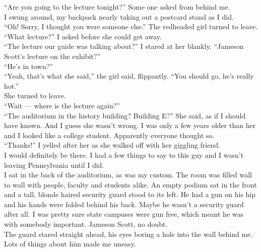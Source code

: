 \documentclass[a5paper]{scrartcl}
\begin{document}
\enquote{Are you going to the lecture tonight?} Some one asked from behind me.\\


I swung around, my backpack nearly taking out a postcard stand as I did.\\


\enquote{Oh! Sorry, I thought you were someone else.} The redheaded girl turned to leave.\\


\enquote{What lecture?} I asked before she could get away.\\


\enquote{The lecture our guide was talking about?} I stared at her blankly. \enquote{Jameson Scott's lecture on the exhibit?}\\


\enquote{He's in town?}\\


\enquote{Yeah, that's what she said,} the girl said, flippantly. \enquote{You should go, he's really hot.}\\


She turned to leave.\\


\enquote{Wait --- where is the lecture again?}\\


\enquote{The auditorium in the history building? Building E?} She said, as if I should have known. And I guess she wasn't wrong. I was only a few years older than her and I looked like a college student. Apparently everyone thought so.\\


\enquote{Thanks!} I yelled after her as she walked off with her giggling friend.\\


I would definitely be there. I had a few things to say to this guy and I wasn't leaving Pennsylvania until I did.\\


I sat in the back of the auditorium, as was my custom. The room was filled wall to wall with people, faculty and students alike. An empty podium sat in the front and a tall, blonde haired security guard stood to its left. He had a gun on his hip and his hands were folded behind his back. Maybe he wasn't a security guard after all. I was pretty sure state campuses were gun free, which meant he was with somebody important. Jameson Scott, no doubt.\\


The guard stared straight ahead, his eyes boring a hole into the wall behind me. Lots of things about him made me uneasy.\\
\end{document}
